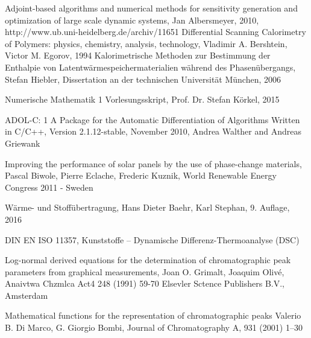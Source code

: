 \documentclass{scrartcl}[12pt, halfparskip]
\begin{document}
\begin{thebibliography}{9}

	 Adjoint-based algorithms and numerical methods for sensitivity generation and optimization of large scale dynamic systems, 
	 Jan Albersmeyer, 2010,
	 http://www.ub.uni-heidelberg.de/archiv/11651
	Differential Scanning Calorimetry of Polymers: physics, chemistry, analysis, technology,
	Vladimir A. Bershtein, Victor M. Egorov,
	1994
	Kalorimetrische Methoden zur Bestimmung
	der Enthalpie von Latentwärmespeichermaterialien
	während des Phasenübergangs,
	Stefan Hiebler, Dissertation an der technischen Universität München, 2006
	
	Numerische Mathematik 1 Vorlesungsskript, 
	Prof. Dr. Stefan Körkel, 2015

	ADOL-C: 1
	A Package for the Automatic Differentiation
	of Algorithms Written in C/C++,
	Version 2.1.12-stable, November 2010,
	Andrea Walther and Andreas Griewank
	
	Improving the performance of solar panels by the use of phase-change materials,
	Pascal Biwole, Pierre Eclache, Frederic Kuznik,
	World Renewable Energy Congress 2011 - Sweden
	
	Wärme- und Stoffübertragung,
	Hans Dieter Baehr, Karl Stephan,
	9. Auflage, 2016
	
	DIN EN ISO 11357, 
	Kunststoffe –
	Dynamische Differenz-Thermoanalyse (DSC)
	
	Log-normal derived equations for the determination
	of chromatographic peak parameters
	from graphical measurements,
	Joan O. Grimalt, Joaquim Olivé,
	Anaivtwa Chzmlca Act4 248 (1991) 59-70
	Elsevler Sctence Publishers B.V., Amsterdam
	
	Mathematical functions for the representation of chromatographic
	peaks
	Valerio B. Di Marco, G. Giorgio Bombi,
	Journal of Chromatography A, 931 (2001) 1–30
  
\end{thebibliography}
\end{document}
